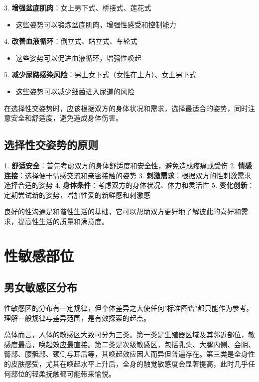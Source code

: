\documentclass[12pt,UTF8]{ctexbook}
\begin{document}
3. \textbf{增强盆底肌肉}：女上男下式、桥接式、莲花式
\begin{itemize}
	\item 这些姿势可以锻炼盆底肌肉，增强性感受和控制能力
\end{itemize}

4. \textbf{改善血液循环}：倒立式、站立式、车轮式
\begin{itemize}
	\item 这些姿势可以促进血液循环，增强性唤起
\end{itemize}

5. \textbf{减少尿路感染风险}：男上女下式（女性在上方）、女上男下式
\begin{itemize}
	\item 这些姿势可以减少细菌进入尿道的风险
\end{itemize}

在选择性交姿势时，应该根据双方的身体状况和需求，选择最适合的姿势，同时注意安全和舒适度，避免造成身体伤害。

\subsection{选择性交姿势的原则}

1. \textbf{舒适安全}：首先考虑双方的身体舒适度和安全性，避免造成疼痛或受伤
2. \textbf{情感连接}：选择便于情感交流和亲密接触的姿势
3. \textbf{刺激需求}：根据双方的性刺激需求选择合适的姿势
4. \textbf{身体条件}：考虑双方的身体状况、体力和灵活性
5. \textbf{变化创新}：定期尝试新的姿势，增加性爱的新鲜感和刺激感

良好的性沟通是和谐性生活的基础，它可以帮助双方更好地了解彼此的喜好和需求，提高性生活的质量和满意度。

\section{性敏感部位}
\subsection{男女敏感区分布}

性敏感区的分布有一定规律，但个体差异之大使任何"标准图谱"都只能作为参考。理解一般规律与差异范围，是有效探索的起点。

总体而言，人体的敏感区大致可分为三类。第一类是生殖器区域及其邻近部位，敏感度最高，唤起效应最直接。第二类是次级敏感区，包括乳头、大腿内侧、会阴、臀部、腰骶部、颈侧与耳后等，其唤起效应因人而异但普遍存在。第三类是全身性的皮肤感受，尤其在唤起水平上升后，全身的触觉敏感度会显著提高，此时几乎任何部位的轻柔抚触都可能带来愉悦。
\end{document}
